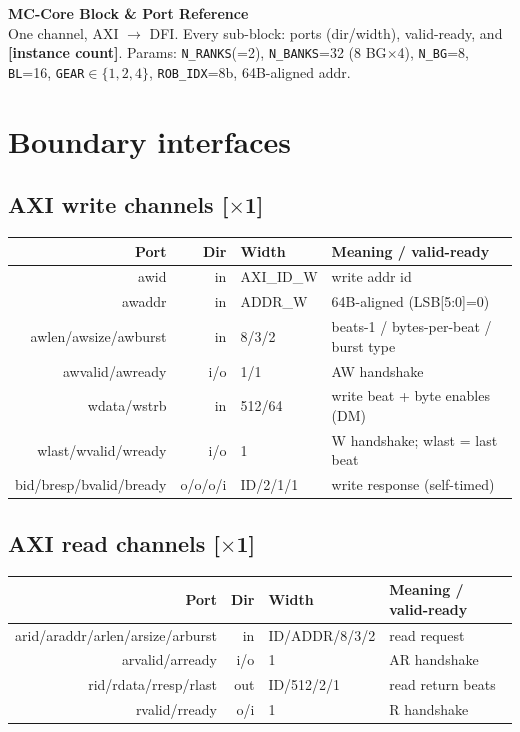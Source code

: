 \documentclass[9pt]{extarticle}
\newcommand{\inst}[1]{\textbf{\textcolor{inst}{[#1]}}}
\newenvironment{ports}{%
  \footnotesize\begin{longtable}{N D W X}\toprule
  \textbf{Port} & \textbf{Dir} & \textbf{Width} & \textbf{Meaning / valid-ready}\\ \midrule\endhead}
  {\bottomrule\end{longtable}}
\begin{document}
\begin{center}
{\LARGE\textbf{MC-Core Block \& Port Reference}}\\[2pt]
{\small One channel, AXI $\rightarrow$ DFI. Every sub-block: ports (dir/width), valid-ready,
and \inst{instance count}. Params: \texttt{N\_RANKS}(=2), \texttt{N\_BANKS}=32 (8 BG$\times$4),
\texttt{N\_BG}=8, \texttt{BL}=16, \texttt{GEAR}$\in\{1,2,4\}$, \texttt{ROB\_IDX}=8b, 64B-aligned addr.}
\end{center}

\section{Boundary interfaces}
\subsection{AXI write channels \inst{$\times$1}}
\begin{ports}
awid & in & AXI\_ID\_W & write addr id\\
awaddr & in & ADDR\_W & 64B-aligned (LSB[5:0]=0)\\
awlen/awsize/awburst & in & 8/3/2 & beats-1 / bytes-per-beat / burst type\\
awvalid/awready & i/o & 1/1 & AW handshake\\
wdata/wstrb & in & 512/64 & write beat + byte enables (DM)\\
wlast/wvalid/wready & i/o & 1 & W handshake; wlast = last beat\\
bid/bresp/bvalid/bready & o/o/o/i & ID/2/1/1 & write response (self-timed)\\
\end{ports}
\subsection{AXI read channels \inst{$\times$1}}
\begin{ports}
arid/araddr/arlen/arsize/arburst & in & ID/ADDR/8/3/2 & read request\\
arvalid/arready & i/o & 1 & AR handshake\\
rid/rdata/rresp/rlast & out & ID/512/2/1 & read return beats\\
rvalid/rready & o/i & 1 & R handshake\\
\end{ports}
\end{document}
